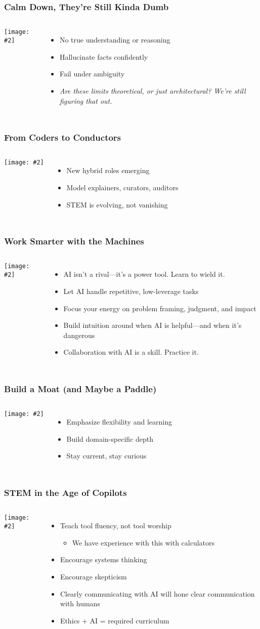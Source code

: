 \documentclass{beamer}
\newcommand{\slidewithimage}[3]{%
  \begin{frame}
    \frametitle{#1}
    \begin{columns}
      \column{0.5\textwidth}
        \texttt{[image: \#2]}\\[1em]
      \column{0.5\textwidth}
        #3
    \end{columns}
  \end{frame}
}
\begin{document}
\slidewithimage{Calm Down, They’re Still Kinda Dumb}{limitations-image.png}{
  \begin{itemize}
    \item No true understanding or reasoning
    \item Hallucinate facts confidently
    \item Fail under ambiguity
    \item \textit{Are these limits theoretical, or just architectural? We're still figuring that out.}
  \end{itemize}
}

\slidewithimage{From Coders to Conductors}{roles-image.png}{
  \begin{itemize}
    \item New hybrid roles emerging
    \item Model explainers, curators, auditors
    \item STEM is evolving, not vanishing
  \end{itemize}
}

\slidewithimage{Work Smarter with the Machines}{coexist-image.png}{
  \begin{itemize}
    \item AI isn't a rival—it's a power tool. Learn to wield it.
    \item Let AI handle repetitive, low-leverage tasks
    \item Focus your energy on problem framing, judgment, and impact
    \item Build intuition around when AI is helpful—and when it’s dangerous
    \item Collaboration with AI is a skill. Practice it.
  \end{itemize}
}

\slidewithimage{Build a Moat (and Maybe a Paddle)}{career-image.png}{
  \begin{itemize}
    \item Emphasize flexibility and learning
    \item Build domain-specific depth
    \item Stay current, stay curious
  \end{itemize}
}

\slidewithimage{STEM in the Age of Copilots}{education-image.png}{
  \begin{itemize}
    \item Teach tool fluency, not tool worship
    \begin{itemize}
      \item We have experience with this with calculators
    \end{itemize}
    \item Encourage systems thinking
    \item Encourage skepticism
    \item Clearly communicating with AI will hone clear communication with humans
    \item Ethics + AI = required curriculum
  \end{itemize}
}
\end{document}
